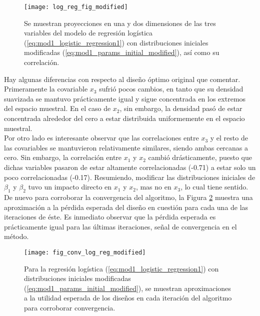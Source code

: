 \begin{figure}[h]
	\centering
    \texttt{[image: log\_reg\_fig\_modified]}
    \caption{Se muestran proyecciones en una y dos dimensiones de las tres variables del modelo de regresión logística (\ref{eq:mod1_logistic_regression1}) con distribuciones iniciales modificadas (\ref{eq:mod1_params_initial_modified}), así como su correlación.}
    \label{fig:log_reg_doe_modified}
\end{figure}








Hay algunas diferencias con respecto al diseño óptimo original que comentar. Primeramente la covariable $x_3$ sufrió pocos cambios, en tanto que su densidad suavizada se mantuvo prácticamente igual y sigue concentrada en los extremos del espacio muestral. En el caso de $x_2$, sin embargo, la densidad pasó de estar concentrada alrededor del cero a estar distribuida uniformemente en el espacio muestral. \\


Por otro lado es interesante observar que las correlaciones entre $x_3$ y el resto de las covariables se mantuvieron relativamente similares, siendo ambas cercanas a cero. Sin embargo, la correlación entre $x_1$ y $x_2$ cambió drásticamente, puesto que dichas variables pasaron de estar altamente correlacionadas (-0.71) a estar solo un poco correlacionadas (-0.17). Resumiendo, modificar las distribuciones iniciales de $\beta_1$ y $\beta_2$ tuvo un impacto directo en $x_1$ y $x_2$, mas no en $x_3$, lo cual tiene sentido. \\



De nuevo para corroborar la convergencia del algoritmo, la Figura \ref{fig:log_reg_conv_modified} muestra una aproximación a la pérdida esperada del diseño en cuestión para cada una de las iteraciones de éste. Es inmediato observar que la pérdida esperada es prácticamente igual para las últimas iteraciones, señal de 
convergencia en el método.


\begin{figure}[h]
	\centering
    \texttt{[image: fig\_conv\_log\_reg\_modified]}
    \caption{Para la regresión logística (\ref{eq:mod1_logistic_regression1}) con distribuciones iniciales modificadas (\ref{eq:mod1_params_initial_modified}), se muestran aproximaciones a la utilidad esperada de los diseños en cada iteración del algoritmo para corroborar convergencia.}
    \label{fig:log_reg_conv_modified}
\end{figure}


